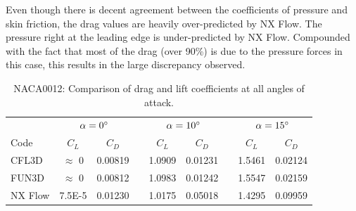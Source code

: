 Even though there is decent agreement between the coefficients of pressure and skin friction, the drag values are heavily over-predicted by NX Flow. The pressure right at the leading edge is under-predicted by NX Flow. Compounded with the fact that most of the drag (over 90\%) is due to the pressure forces in this case, this results in the large discrepancy observed.
\begin{table}
    \centering
    \caption{NACA0012: Comparison of drag and lift coefficients at all angles of attack.}
    \label{tab:naca0012}
    \begin{tabular}{@{}l cc c cc c cc@{}}
        \toprule
         & \multicolumn{2}{c}{$\alpha = 0^\circ$} & \phantom{a}
            & \multicolumn{2}{c}{$\alpha = 10^\circ$} & \phantom{a}
            & \multicolumn{2}{c}{$\alpha = 15^\circ$}\\
        \cline{2-3} \cline{5-6} \cline{8-9}
        Code & $C_L$ & $C_D$ && $C_L$ & $C_D$ && $C_L$ & $C_D$ \\
        \midrule
        CFL3D & $\approx$ 0 & 0.00819 && 1.0909 & 0.01231 && 1.5461 & 0.02124 \\
        FUN3D & $\approx$ 0 & 0.00812 && 1.0983 & 0.01242 && 1.5547 & 0.02159 \\
        NX Flow & 7.5E-5    & 0.01230 && 1.0175 & 0.05018 && 1.4295 & 0.09959 \\
        \bottomrule
    \end{tabular}
\end{table}

